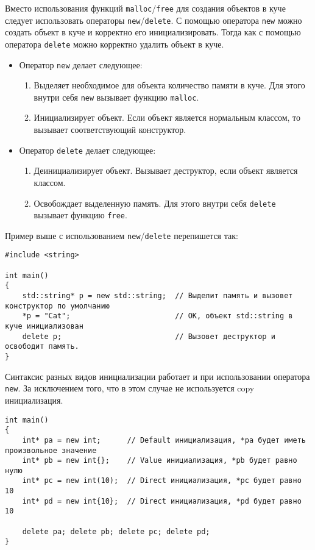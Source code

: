\documentclass{article}
\begin{document}
Вместо использования функций \texttt{malloc}/\texttt{free} для создания объектов в куче следует использовать операторы \texttt{new}/\texttt{delete}. С помощью оператора \texttt{new} можно создать объект в куче и корректно его инициализировать. Тогда как с помощью оператора \texttt{delete} можно корректно удалить объект в куче.
\begin{itemize}
\item Оператор \texttt{new} делает следующее:
\begin{enumerate}
\item Выделяет необходимое для объекта количество памяти в куче. Для этого внутри себя \texttt{new} вызывает функцию \texttt{malloc}.
\item Инициализирует объект. Если объект является нормальным классом, то вызывает соответствующий конструктор.
\end{enumerate}
\item Оператор \texttt{delete} делает следующее:
\begin{enumerate}
\item Деинициализирует объект. Вызывает деструктор, если объект является классом.
\item Освобождает выделенную память. Для этого внутри себя \texttt{delete} вызывает функцию \texttt{free}.
\end{enumerate}
\end{itemize}
Пример выше с использованием \texttt{new}/\texttt{delete} перепишется так:
\begin{lstlisting}
#include <string>

int main()
{
	std::string* p = new std::string;  // Выделит память и вызовет конструктор по умолчанию
	*p = "Cat";                        // OK, объект std::string в куче инициализован
	delete p;                          // Вызовет деструктор и освободит память.
}
\end{lstlisting}
Синтаксис разных видов инициализации работает и при использовании оператора \texttt{new}.
За исключением того, что в этом случае не используется copy инициализация.
\begin{lstlisting}
int main()
{
	int* pa = new int;      // Default инициализация, *pa будет иметь произвольное значение
	int* pb = new int{};    // Value инициализация, *pb будет равно нулю
	int* pc = new int(10);  // Direct инициализация, *pc будет равно 10
	int* pd = new int{10};  // Direct инициализация, *pd будет равно 10
	
	delete pa; delete pb; delete pc; delete pd;
}
\end{lstlisting}
\end{document}
